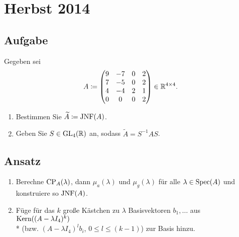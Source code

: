 
\newpage

\section{Herbst 2014}

\subsection{Aufgabe}
Gegeben sei
\begin{equation*}
	A \coloneqq \begin{pmatrix}
		9 & -7 & 0 & 2 \\
		7 & -5 & 0 & 2 \\
		4 & -4 & 2 & 1 \\
		0 & 0 & 0 & 2 
	\end{pmatrix} \in \mathbb{R}^{4 \times 4}\text{.}
\end{equation*}
\begin{enumerate}
	\item Bestimmen Sie \( \widetilde{A} \coloneqq \text{JNF}(A) \).
	\item Geben Sie \( S \in \text{GL}_4(\mathbb{R}) \) an, sodass \( \widetilde{A} = S^{-1}AS \).
\end{enumerate}

\subsection{Ansatz}
\begin{enumerate}
	\item Berechne \( \text{CP}_A(\lambda) \), dann \( \mu_a(\lambda) \) und \( \mu_g(\lambda) \) für alle \( \lambda \in \text{Spec}(A) \) und konstruiere so \( \text{JNF}(A) \).
	\item Füge für das \( k \) große Kästchen zu \( \lambda \) Basisvektoren \( b_1,\dots \) aus \( \text{Kern}((A-\lambda I_4)^k) \) \\* (bzw. \( (A-\lambda I_4)^lb_i \), \( 0 \leq l \leq (k-1) \)) zur Basis hinzu.
\end{enumerate}

